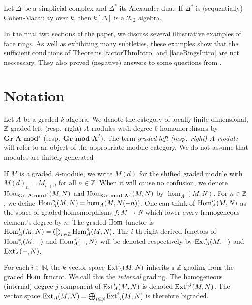 \documentclass[11pt,righttag]{amsart}
\begin{document}
\begin{thm}
\label{faceRingsIntro}
Let ${\Delta}$ be a simplicial complex and ${\Delta}^*$ its Alexander dual. If ${\Delta}^*$ is (sequentially) Cohen-Macaulay over $k$, then $k[{\Delta}]$ is a ${{\mathcal K}}_2$ algebra.
\end{thm}

In the final two sections of the paper, we discuss several illustrative examples of face rings.  As well as exhibiting many subtleties, these examples show that the sufficient conditions of Theorems \ref{factorThmIntro} and \ref{faceRingsIntro} are not neccessary.  They also proved (negative) answers to some questions from \cite{CS}. 

\section{Notation}
\label{Notation}

 Let $A$ be a graded $k$-algebra. We denote the category of locally finite dimensional, ${{\mathbb Z}}$-graded left (resp.\ right) $A$-modules with degree 0 homomorphisms by $\textbf{Gr-A-mod}^{f}$ (resp.\ $\textbf{Gr-mod-A}^{f}$). The term \emph{graded left (resp.\ right) $A$-module} will refer to an object of the appropriate module category. We do not assume that modules are finitely generated. 
 
If $M$ is a graded $A$-module, we write $M(d)$ for the shifted graded module with $M(d)_n=M_{n+d}$ for all $n\in{{\mathbb Z}}$. When it will cause no confusion, we denote  ${\hbox{Hom}}_{\textbf{Gr-A-mod}^{f}}(M,N)$ and ${\hbox{Hom}}_{\textbf{Gr-mod-A}^{f}}(M,N)$ by $\hom_A(M,N)$. For $n\in{{\mathbb Z}}$, we define ${\hbox{Hom}}^n_A(M,N)=\hom_A(M,N(-n))$. One can think of ${\hbox{Hom}}_A^n(M,N)$ as the space of graded homomorphisms $f:M\rightarrow N$ which lower every homogeneous element's degree by $n$. The graded ${\hbox{Hom}}$ functor is ${\hbox{Hom}}^*_A(M,N)=\bigoplus_{n\in{{\mathbb Z}}} {\hbox{Hom}}^n_A(M,N)$. The $i$-th right derived functors of ${\hbox{Hom}}_A^*(M,-)$ and ${\hbox{Hom}}_A^*(-,N)$ will be denoted respectively by ${\hbox{{\rm Ext}}}^i_A(M,-)$ and ${\hbox{{\rm Ext}}}^i_A(-,N)$. 

For each $i\in{{\mathbb N}}$, the $k$-vector space ${\hbox{{\rm Ext}}}_A^i(M,N)$ inherits a ${{\mathbb Z}}$-grading from the graded ${\hbox{Hom}}$ functor. We call this the \emph{internal} grading. The homogeneous (internal) degree $j$ component of ${\hbox{{\rm Ext}}}_A^i(M,N)$ is denoted ${\hbox{{\rm Ext}}}^{i,j}_A(M,N)$. The vector space ${\hbox{{\rm Ext}}}_A(M,N)=\bigoplus_{i\in{{\mathbb N}}} {\hbox{{\rm Ext}}}_A^i(M,N)$ is therefore bigraded. 
\end{document}
